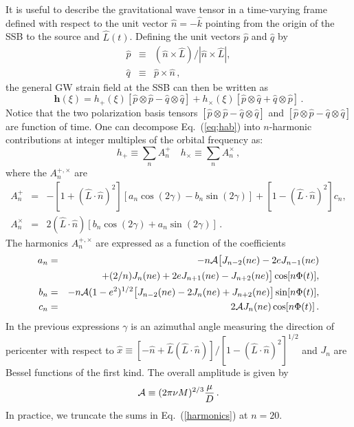 \documentclass[12pt]{iopart}
\def\be{\begin{equation}}
\def\ee{\end{equation}}
\begin{document}
It is useful to describe the gravitational wave tensor in a time-varying frame defined with respect to the unit vector ${\hat n} = -{\hat k}$ pointing from the origin of the SSB to the source and ${ \hat L}(t)$. Defining the unit vectors 
${ \hat p}$ and ${ \hat q}$ by
\begin{eqnarray} \label{pq}
{ \hat p} &\equiv& ({ \hat n}\times { \hat L})/
                    |{ \hat n}\times { \hat L}|, \nonumber\\
{ \hat q} &\equiv& { \hat p} \times { \hat n}\,,
\end{eqnarray}
the general GW strain field at the SSB can then be written as
%
\begin{equation}
\label{eq:hab}
\mathbf{h}(\xi) = h_{+}(\xi) \left[ \hat{p}\otimes \hat{p} - \hat{q}\otimes \hat{q} \right] + h_{\times}(\xi) \left[ \hat{p}\otimes \hat{q} + \hat{q}\otimes \hat{p} \right]\,.
\end{equation}
%
Notice that the two polarization basis tensors $[ \hat{p}\otimes \hat{p} - \hat{q}\otimes \hat{q}]$  and $[ \hat{p}\otimes \hat{p} - \hat{q}\otimes \hat{q}]$ are function of time. 
One can decompose Eq.\ (\ref{eq;hab}) into $n$-harmonic contributions at integer multiples of the orbital frequency as:
\be
h_{+}\equiv \sum_n A^{+}_n \quad h_{\times}\equiv \sum_n A^{\times}_n \,,
\label{harmonics}
\ee
where the $A^{+,\times}_n$ are
\begin{eqnarray} \label{A}
A^{+}_n &=&-[1+({ \hat L}\cdot{ \hat n})^2]\left[
a_n\cos(2\gamma)-b_n\sin(2\gamma)\right]
+[1-({ \hat L}\cdot{ \hat n})^2]c_n, \nonumber\\
A^{\times}_n&=& 2({ \hat L}\cdot{ \hat n})\left[
b_n \cos(2\gamma)+a_n \sin(2\gamma)\right]\,.
\end{eqnarray}
The harmonics $A^{+,\times}_n$ are expressed as a function of the coefficients
\begin{eqnarray} \label{abc}
a_n &=& - n{\cal A}\bigl[J_{n-2}(ne)-2eJ_{n-1}(ne) \nonumber \\
       && +(2/n)J_n(ne) +2eJ_{n+1}(ne)-J_{n+2}(ne)\bigr]\cos[n\Phi(t)],
\nonumber\\
b_n &=& - n{\cal A}(1-e^2)^{1/2}\bigl[J_{n-2}(ne)-2J_{n}(ne)
+J_{n+2}(ne)\bigr]\sin[n \Phi(t)],
\nonumber\\
c_n &=& 2{\cal A}J_n(ne)\cos[n\Phi(t)]\,.
\end{eqnarray}
In the previous expressions $\gamma$ is an azimuthal angle measuring the direction of pericenter with respect to $\hat x \equiv [-\hat n + \hat L (\hat L\cdot \hat n)]/[1-(\hat L\cdot \hat n)^2]^{1/2}$ and $J_n$ are Bessel functions of the first kind. The overall amplitude is given by
\begin{equation} \label{calA}
{\cal A}\equiv (2\pi \nu M)^{2/3}\frac{\mu}{D}\,.
\end{equation}
In practice, we truncate the sums in Eq.~(\ref{harmonics}) at $n=20$.
\end{document}
